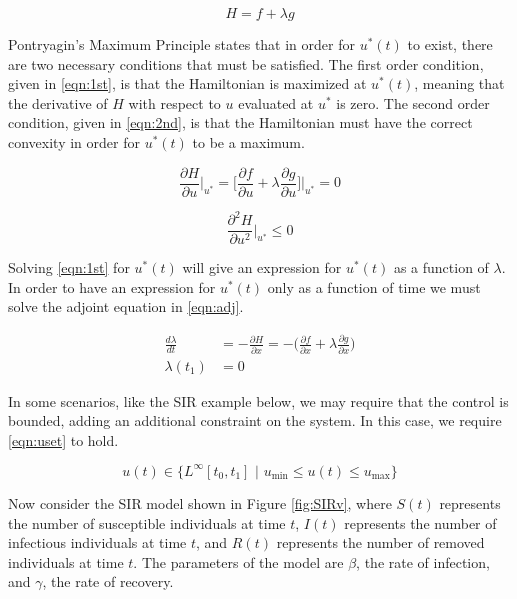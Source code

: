 \documentclass[12pt]{article}
\begin{document}
\begin{equation} \label{eqn:ham}
	H = f + \lambda g
\end{equation}

Pontryagin's Maximum Principle states that in order for $u^*(t)$ to exist, there are two necessary conditions that must be satisfied. The first order condition, given in \eqref{eqn:1st}, is that the Hamiltonian is maximized at $u^*(t)$, meaning that the derivative of $H$ with respect to $u$ evaluated at $u^*$ is zero. The second order condition, given in \eqref{eqn:2nd}, is that the Hamiltonian must have the correct convexity in order for $u^*(t)$ to be a maximum.

\begin{equation} \label{eqn:1st}
	\frac{\partial H}{\partial u}\Big|_{u^*} = \Big[ \frac{\partial f}{\partial u} + \lambda \frac{\partial g}{\partial u} \Big] \Big|_{u^*} = 0 
\end{equation}

\begin{equation} \label{eqn:2nd}
	\frac{\partial^2 H}{\partial u^2} \Big|_{u^*} \leq 0
\end{equation}

Solving \eqref{eqn:1st} for $u^*(t)$ will give an expression for $u^*(t)$ as a function of $\lambda$. In order to have an expression for $u^*(t)$ only as a function of time we must solve the adjoint equation in \eqref{eqn:adj}.

\begin{equation} \label{eqn:adj}
	\begin{aligned}
		\frac{d\lambda}{dt} &= -\frac{\partial H}{\partial x} = - \Big(\frac{\partial f}{\partial x} + \lambda \frac{\partial g}{\partial x}\Big) \\[5pt]
		\lambda(t_1) &= 0
	\end{aligned}
\end{equation}

In some scenarios, like the SIR example below, we may require that the control is bounded, adding an additional constraint on the system. In this case, we require \eqref{eqn:uset} to hold.

\begin{equation} \label{eqn:uset}
	u(t) \in \big\{ L^{\infty}[t_0, t_1] \,\, \big| \,\, u_{\min} \leq u(t) \leq u_{\max} \big\}
\end{equation}

Now consider the SIR model shown in Figure \ref{fig:SIRv}, where $S(t)$ represents the number of susceptible individuals at time $t$, $I(t)$ represents the number of infectious individuals at time $t$, and $R(t)$ represents the number of removed individuals at time $t$. The parameters of the model are $\beta$, the rate of infection, and $\gamma$, the rate of recovery. 
\end{document}
